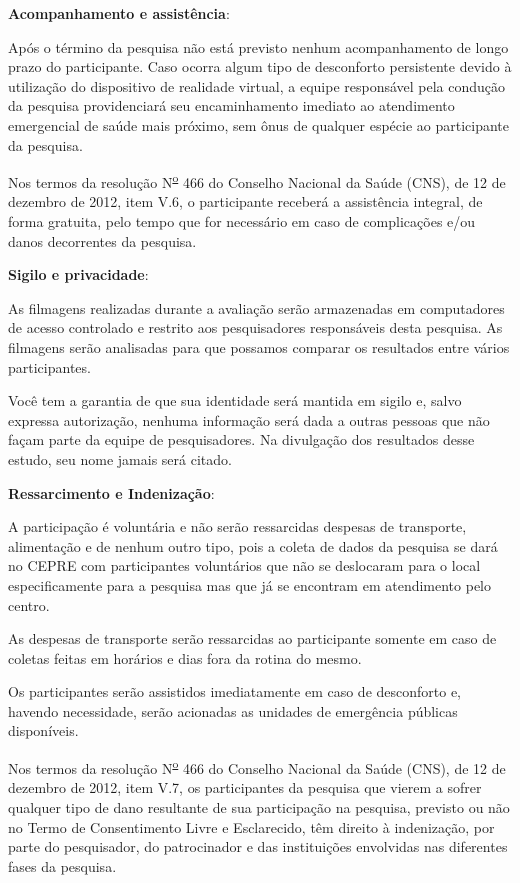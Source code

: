 \documentclass[a4paper,11pt,titlepage,singlespacing]{article}
\begin{document}
\vspace{10pt}
\textbf{Acompanhamento e assistência}:

Após o término da pesquisa não está previsto nenhum acompanhamento de longo prazo do participante. Caso ocorra algum tipo de desconforto persistente devido à utilização do dispositivo de realidade virtual, a equipe responsável pela condução da pesquisa providenciará seu encaminhamento imediato ao atendimento emergencial de saúde mais próximo, sem ônus de qualquer espécie ao participante da pesquisa.

Nos termos da resolução N\textsuperscript{\underline{o}} 466 do Conselho Nacional da Saúde (CNS), de 12 de dezembro de 2012, item V.6, o participante receberá a assistência integral, de forma gratuita, pelo tempo que for necessário em caso de complicações e/ou danos decorrentes da pesquisa.

\vspace{10pt}
\textbf{Sigilo e privacidade}:

As filmagens realizadas durante a avaliação serão armazenadas em computadores de acesso controlado e restrito aos pesquisadores responsáveis desta pesquisa. As filmagens serão analisadas para que possamos comparar os resultados entre vários participantes.

Você tem a garantia de que sua identidade será mantida em sigilo e, salvo expressa autorização, nenhuma informação será dada a outras pessoas que não façam parte da equipe de pesquisadores. Na divulgação dos resultados desse estudo, seu nome jamais será citado.


\vspace{10pt}
\textbf{Ressarcimento e Indenização}:
	
A participação é voluntária e não serão ressarcidas despesas de transporte, alimentação e de nenhum outro tipo, pois a coleta de dados da pesquisa se dará no CEPRE com participantes voluntários que não se deslocaram para o local especificamente para a pesquisa mas que já se encontram em atendimento pelo centro.

As despesas de transporte serão ressarcidas ao participante somente em caso de coletas feitas em horários e dias fora da rotina do mesmo.

Os participantes serão assistidos imediatamente em caso de desconforto e, havendo necessidade, serão acionadas as unidades de emergência públicas disponíveis. 

Nos termos da resolução N\textsuperscript{\underline{o}} 466 do Conselho Nacional da Saúde (CNS), de 12 de dezembro de 2012, item V.7, os participantes da pesquisa que vierem a sofrer qualquer tipo de dano resultante de sua participação na pesquisa, previsto ou não no Termo de Consentimento Livre e Esclarecido, têm direito à indenização, por parte do pesquisador, do patrocinador e das instituições envolvidas nas diferentes fases da pesquisa.
\end{document}
